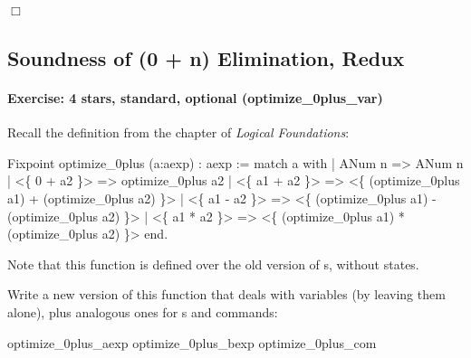 \documentclass[12pt]{report}
\begin{document}
\ensuremath{\Box} 
\begin{coqdoccode}
\coqdocemptyline
\end{coqdoccode}
\subsection{Soundness of (0 + n) Elimination, Redux}



\paragraph{Exercise: 4 stars, standard, optional (optimize\_0plus\_var)}




    Recall the definition  from the  chapter
    of \textit{Logical Foundations}:


    Fixpoint optimize\_0plus (a:aexp) : aexp :=
      match a with
      | ANum n =>
          ANum n
      | <\{ 0 + a2 \}> =>
          optimize\_0plus a2
      | <\{ a1 + a2 \}> =>
          <\{ (optimize\_0plus a1) + (optimize\_0plus a2) \}>
      | <\{ a1 - a2 \}> =>
          <\{ (optimize\_0plus a1) - (optimize\_0plus a2) \}>
      | <\{ a1 * a2 \}> =>
          <\{ (optimize\_0plus a1) * (optimize\_0plus a2) \}>
      end.


   Note that this function is defined over the old version of s,
   without states.


   Write a new version of this function that deals with variables (by
   leaving them alone), plus analogous ones for s and commands:


     optimize\_0plus\_aexp
     optimize\_0plus\_bexp
     optimize\_0plus\_com
\end{document}
